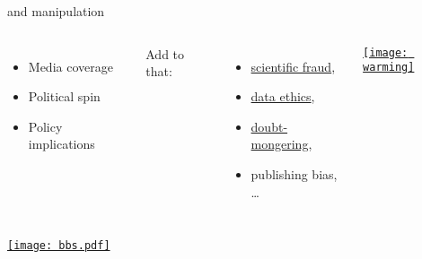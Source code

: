 \documentclass[t]{beamer}
\begin{document}
  \begin{frame}[t]{ and manipulation}

    \begin{columns}[T]
      

      \begin{itemize}
        \item Media coverage        %
        \item Political spin        %
        \item Policy implications   %
      \end{itemize}
      
      Add to that:
      
      \begin{itemize}
        \item \href{http://andrewgelman.com/2012/08/scientific-fraud-double-standards-and-institutions-protecting-themselves/}{scientific fraud},
        \item \href{http://andrewgelman.com/2012/10/ethical-standards-in-different-data-communities/}{data ethics}, %
        \item \href{https://en.wikipedia.org/wiki/Merchants_of_Doubt}{doubt-mongering}, %
        \item publishing bias, … %
      \end{itemize}
              
        
        \href{https://metofficenews.wordpress.com/2010/07/28/unmistakable-signs-of-a-warming-world/}%
        {\texttt{[image: warming]}}

    \end{columns}
    
  \end{frame}
    
  \begin{frame}[c, plain]
    
    \href{http://www2.psych.ubc.ca/~henrich/pdfs/WeirdPeople.pdf}{\texttt{[image: bbs.pdf]}}  

  \end{frame}

      {}
  \begin{frame}[c, plain]{}
  \end{frame} 
  
\end{document}
